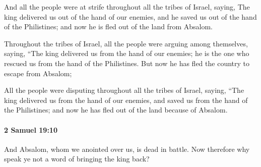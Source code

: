 			\begin{versebox}
					\item[BHS] 
					\item[ASV] And all the people were at strife throughout all the tribes of Israel, saying, The king delivered us out of the hand of our enemies, and he saved us out of the hand of the Philistines; and now he is fled out of the land from Absalom.
					\item[NIV] Throughout the tribes of Israel, all the people were arguing among themselves, saying, “The king delivered us from the hand of our enemies; he is the one who rescued us from the hand of the Philistines. But now he has fled the country to escape from Absalom;
					\item[NRSV] All the people were disputing throughout all the tribes of Israel, saying, “The king delivered us from the hand of our enemies, and saved us from the hand of the Philistines; and now he has fled out of the land because of Absalom.
			\end{versebox}

		\paragraph{2 Samuel 19:10} %
			\label{2SAMUEL-19-10}

			And Absalom, whom we anointed over us, is dead in battle. Now therefore why speak ye not a word of bringing the king back?

